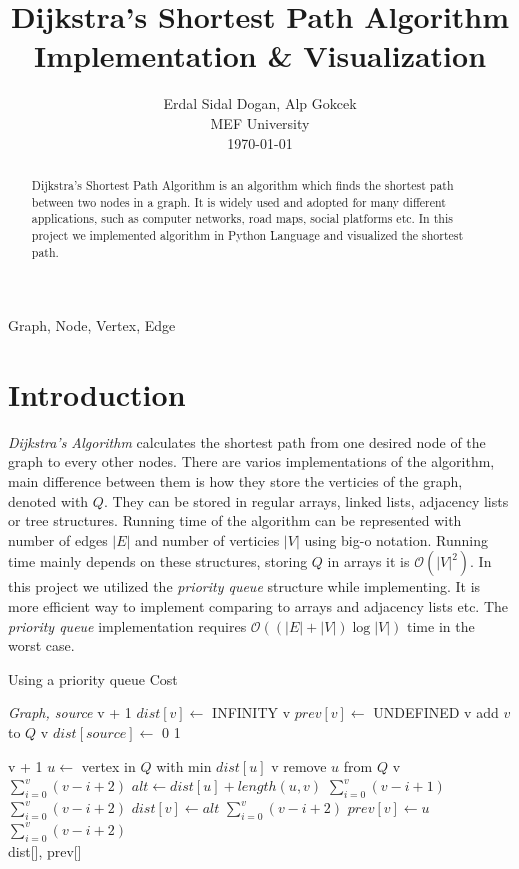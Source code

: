 \documentclass[twocolumns]{IEEEtran}
\author{Erdal Sidal Dogan, Alp Gokcek \\ MEF University \\ \today}
\title{Dijkstra's Shortest Path Algorithm Implementation \& Visualization}
\begin{document}
	\maketitle
	\begin{abstract}
		Dijkstra's Shortest Path Algorithm \cite{dijkstra} is an algorithm which finds the shortest path between two nodes in a graph. It is widely used and adopted for many different applications, such as computer networks, road maps, social platforms etc. In this project we implemented algorithm in Python Language and visualized the shortest path.
	\end{abstract}
	\begin{IEEEkeywords}
		Graph, Node, Vertex, Edge
	\end{IEEEkeywords}
	\section{Introduction}
	\textit{Dijkstra's Algorithm} calculates the shortest path from one desired node of the graph to every other nodes. There are varios implementations of the algorithm, main difference between them is how they store the verticies of the graph, denoted with $Q$. They can be stored in regular arrays, linked lists, adjacency lists or tree structures.\cite{524471} Running time of the algorithm can be represented with number of edges $|E|$ and number of verticies $|V|$ using big-o notation. Running time mainly depends on these structures, storing $Q$ in arrays it is $\mathcal{O}(|V|^2)$. In this project we utilized the \textit{priority queue} structure while implementing. It is more efficient way to implement comparing to arrays and adjacency lists etc. The \textit{priority queue} implementation requires $\mathcal{O}((|E| + |V|) \log{|V|})$ time in the worst case. 
	\begin{algorithm}
		\caption{Using a priority queue \cite{wiki} \hfill Cost}
		\begin{algorithmic}[1]
			 {\textit{Graph, source}}
					\hfill v + 1
					\State $dist[v] \leftarrow$ INFINITY	\hfill v
					\State $prev[v] \leftarrow$ UNDEFINED	\hfill v
					\State add $v$ to $Q$	\hfill v                      
				\EndFor
				\State $dist[source] \leftarrow$ 0	\hfill 1
	
					\hfill v + 1
					\State $u \leftarrow$ vertex in $Q$ with min $dist[u]$	\hfill v
					\State remove $u$ from $Q$	\hfill v
						\hfill $\sum_{i=0}^{v}(v-i+2)$
						\State $alt \leftarrow dist[u] + length(u, v)$ $\sum_{i=0}^{v}(v-i+1)$
							\hfill $\sum_{i=0}^{v}(v-i+2)$
							\State $dist[v] \leftarrow alt$	\hfill $\sum_{i=0}^{v}(v-i+2)$
							\State $prev[v] \leftarrow u$	\hfill $\sum_{i=0}^{v}(v-i+2)$
						\EndIf
					\EndFor
				\EndWhile \\
				\Return dist[], prev[]
			\EndFunction
		\end{algorithmic}
	\end{algorithm}
\end{document}
